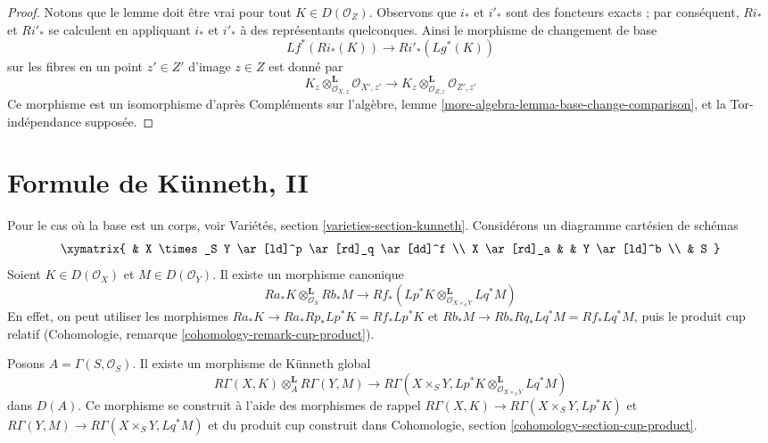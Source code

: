\begin{proof}
Notons que le lemme doit être vrai pour tout $K \in D(\mathcal{O}_Z)$.
Observons que $i_*$ et $i'_*$ sont des foncteurs exacts ; par conséquent,
$Ri_*$ et $Ri'_*$ se calculent en appliquant $i_*$ et $i'_*$
à des représentants quelconques. Ainsi le morphisme de changement de base
$$
Lf^*(Ri_*(K)) \longrightarrow Ri'_*(Lg^*(K))
$$
sur les fibres en un point $z' \in Z'$ d'image $z \in Z$ est donné par
$$
K_z \otimes_{\mathcal{O}_{X, z}}^\mathbf{L} \mathcal{O}_{X', z'}
\longrightarrow
K_z \otimes_{\mathcal{O}_{Z, z}}^\mathbf{L} \mathcal{O}_{Z', z'}
$$
Ce morphisme est un isomorphisme d'après
Compléments sur l'algèbre, lemme \ref{more-algebra-lemma-base-change-comparison},
et la Tor-indépendance supposée.
\end{proof}








\section{Formule de K\"unneth, II}
\label{section-kunneth}

\noindent
Pour le cas où la base est un corps, voir
Variétés, section \ref{varieties-section-kunneth}.
Considérons un diagramme cartésien de schémas
$$
\xymatrix{
& X \times_S Y \ar[ld]^p \ar[rd]_q \ar[dd]^f \\
X \ar[rd]_a & & Y \ar[ld]^b \\
& S
}
$$
Soient $K \in D(\mathcal{O}_X)$ et $M \in D(\mathcal{O}_Y)$.
Il existe un morphisme canonique
\begin{equation}
\label{equation-kunneth}
Ra_*K \otimes_{\mathcal{O}_S}^\mathbf{L} Rb_*M
\longrightarrow
Rf_*(Lp^*K \otimes_{\mathcal{O}_{X \times_S Y}}^\mathbf{L} Lq^*M)
\end{equation}
En effet, on peut utiliser les morphismes
$Ra_*K \to Ra_*Rp_* Lp^*K = Rf_*Lp^*K$ et
$Rb_*M \to Rb_*Rq_* Lq^*M = Rf_*Lq^*M$, puis le produit cup
relatif (Cohomologie, remarque \ref{cohomology-remark-cup-product}).

\medskip\noindent
Posons $A = \Gamma(S, \mathcal{O}_S)$. Il existe un morphisme de K\"unneth global
\begin{equation}
\label{equation-kunneth-global}
R\Gamma(X, K) \otimes_A^\mathbf{L} R\Gamma(Y, M)
\longrightarrow
R\Gamma(X \times_S Y,
Lp^*K \otimes_{\mathcal{O}_{X \times_S Y}}^\mathbf{L} Lq^*M)
\end{equation}
dans $D(A)$. Ce morphisme se construit à l'aide des morphismes de rappel
$R\Gamma(X, K) \to R\Gamma(X \times_S Y, Lp^*K)$ et
$R\Gamma(Y, M) \to R\Gamma(X \times_S Y, Lq^*M)$ et
du produit cup construit dans
Cohomologie, section \ref{cohomology-section-cup-product}.

